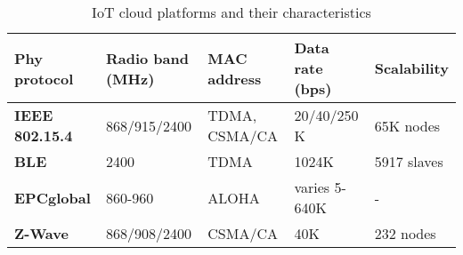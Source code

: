 \begin{table}[h!]
\begin{center}
	\begin{tabulary}{\textwidth}{L|L|L|L|L}
	\bf{Phy protocol}  & \bf{Radio band (MHz)} & \bf{MAC address} & \bf{Data rate (bps)} & \bf{Scalability} \\\hline
	\bf{IEEE 802.15.4} & 868/915/2400          & TDMA, CSMA/CA    & 20/40/250 K          & 65K nodes  \\\hline
	\bf{BLE}           & 2400                  & TDMA             & 1024K                & 5917 slaves\\\hline
	\bf{EPCglobal}     & 860-960               & ALOHA            & varies 5-640K        & -          \\\hline
	\bf{Z-Wave}        & 868/908/2400          & CSMA/CA          & 40K                  & 232 nodes  \\\hline
		\end{tabulary}
	\caption{\label{tab:IoTPlatforms} IoT cloud platforms and their characteristics \cite{al-fuqaha_internet_24}}
\end{center}
\end{table}


